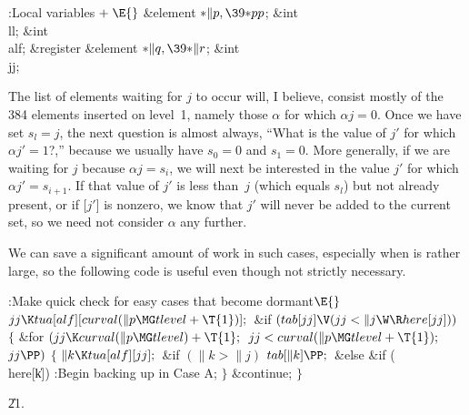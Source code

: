 \B{}:Local variables\X${}\mathrel+\E{}$\6
\&{element} ${}{*}\|p,\39{*}\\{pp}{}$;%
\6
\&{int} \\{ll};\6
\&{int} \\{alf};\6
\&{register} \&{element} ${}{*}\|q,\39{*}\|r{}$;\6
\&{int} \\{jj};\par
\fi

The list of elements waiting for $j$ to occur will, I believe, consist
mostly of the 384 elements inserted on level~1, namely those $\alpha$ for which
$\alpha j=0$. Once we have set $s_l=j$, the next question is almost
always, ``What is the value of $j'$ for which $\alpha j'=1$?,'' because
we usually have $s_0=0$ and $s_1=0$. More generally, if we are waiting
for $j$ because $\alpha j=s_i$, we will next be interested in the
value $j'$ for which $\alpha j'=s_{i+1}$. If that value of $j'$ is
less than~$j$ (which equals $s_l$) but not already present,
or if [$j'$] is nonzero,
we know that $j'$ will never be added to the current set, so we need not
consider $\alpha$ any further.

We can save a significant amount of work in such cases,
especially when  is rather large, so the following code is
useful even though not strictly necessary.

\Y\B\4:Make quick check for easy cases that become dormant\X${}\E{}$\6
$\\{jj}\K\\{tua}[\\{alf}][\\{curval}(\|p\MG\\{tlevel}+\T{1})];{}$\6
\&{if} ${}(\\{tab}[\\{jj}]\V(\\{jj}<\|j\W\R\\{here}[\\{jj}])){}$\5
${}\{{}$\1\6
\&{for} ${}(\\{jj}\K\\{curval}(\|p\MG\\{tlevel})+\T{1};{}$ ${}\\{jj}<%
\\{curval}(\|p\MG\\{tlevel}+\T{1});{}$ ${}\\{jj}\PP){}$\5
${}\{{}$\1\6
${}\|k\K\\{tua}[\\{alf}][\\{jj}];{}$\6
\&{if} ${}(\|k>\|j){}$\1\5
${}\\{tab}[\|k]\PP;{}$\2\6
\&{else} \&{if} (\\{here}[\|k])\1\5
:Begin backing up in Case A\X;\2\6
\4${}\}{}$\2\6
\&{continue};\6
\4${}\}{}$\2\par
\U21.\fi

